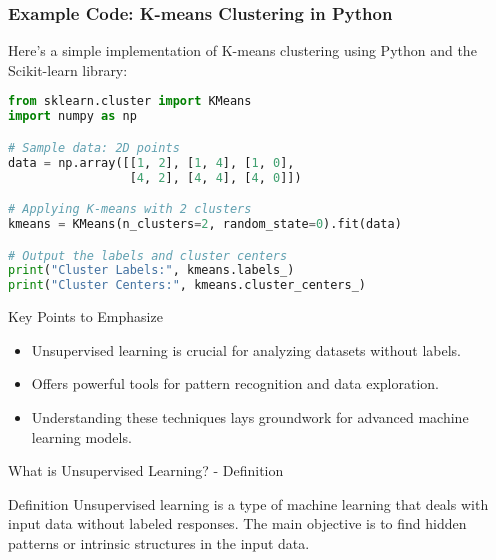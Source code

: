 \documentclass[aspectratio=169]{beamer}
\begin{document}
\begin{frame}[fragile]
    \frametitle{Example Code: K-means Clustering in Python}
    Here’s a simple implementation of K-means clustering using Python and the Scikit-learn library:
    
    \begin{lstlisting}[language=Python]
from sklearn.cluster import KMeans
import numpy as np

# Sample data: 2D points
data = np.array([[1, 2], [1, 4], [1, 0],
                 [4, 2], [4, 4], [4, 0]])

# Applying K-means with 2 clusters
kmeans = KMeans(n_clusters=2, random_state=0).fit(data)

# Output the labels and cluster centers
print("Cluster Labels:", kmeans.labels_)
print("Cluster Centers:", kmeans.cluster_centers_)
    \end{lstlisting}
    
    \begin{block}{Key Points to Emphasize}
        \begin{itemize}
            \item Unsupervised learning is crucial for analyzing datasets without labels.
            \item Offers powerful tools for pattern recognition and data exploration.
            \item Understanding these techniques lays groundwork for advanced machine learning models.
        \end{itemize}
    \end{block}
\end{frame}

\begin{frame}[fragile]{What is Unsupervised Learning? - Definition}
    \begin{block}{Definition}
        Unsupervised learning is a type of machine learning that deals with input data without labeled responses. 
        The main objective is to find hidden patterns or intrinsic structures in the input data.
    \end{block}
\end{frame}
\end{document}
